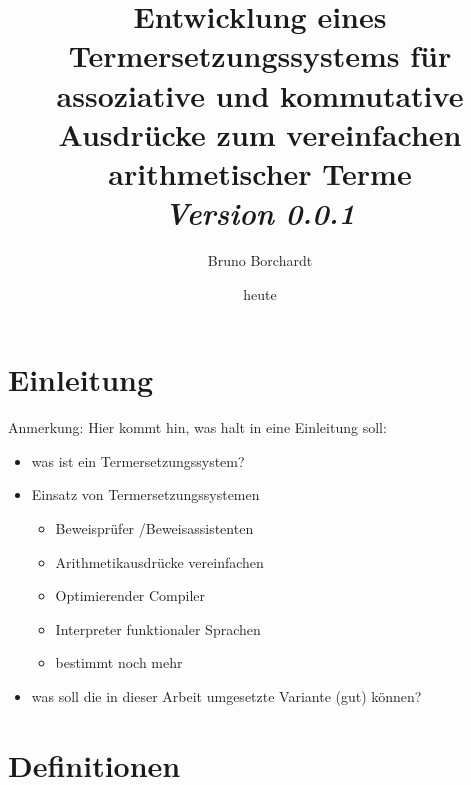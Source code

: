 \documentclass{article}
\title{Entwicklung eines Termersetzungssystems für assoziative und kommutative Ausdrücke zum vereinfachen arithmetischer Terme\\ \textit{Version 0.0.1}}
\author{Bruno Borchardt}
\date{heute}
\begin{document}
\maketitle

\tableofcontents

\clearpage

\section{Einleitung}
\begin{itshape}
Anmerkung: Hier kommt hin, was halt in eine Einleitung soll:
\begin{itemize}
    \item was ist ein Termersetzungssystem?
    \item Einsatz von Termersetzungssystemen
    \begin{itemize}
        \item Beweisprüfer /Beweisassistenten
        \item Arithmetikausdrücke vereinfachen
        \item Optimierender Compiler
	\item Interpreter funktionaler Sprachen
        \item bestimmt noch mehr
    \end{itemize}
    \item was soll die in dieser Arbeit umgesetzte Variante (gut) können?
\end{itemize}
\end{itshape}

\section{Definitionen}
\end{document}
